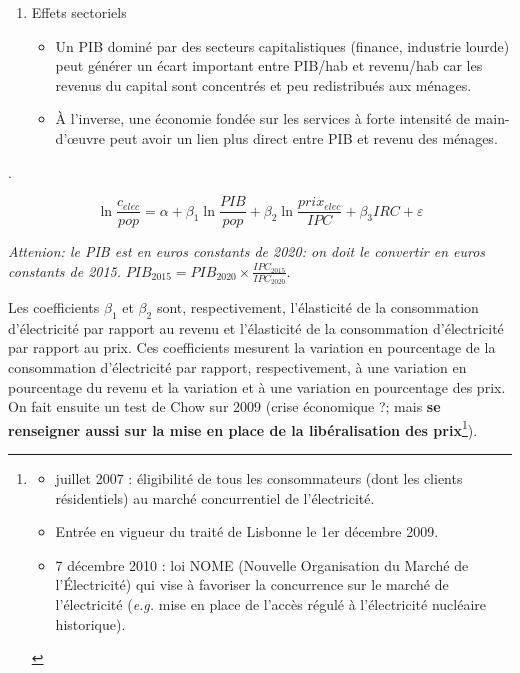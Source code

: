 {{\begin{enumerate}
\begin{itemize}
    \end{itemize}
    \item Effets sectoriels
    \begin{itemize}
        \item Un PIB dominé par des secteurs capitalistiques (finance, industrie lourde) peut générer un écart important entre PIB/hab et revenu/hab car les revenus du capital sont concentrés et peu redistribués aux ménages.
        \item À l’inverse, une économie fondée sur les services à forte intensité de main-d’œuvre peut avoir un lien plus direct entre PIB et revenu des ménages.
    \end{itemize}
\end{enumerate}}}.

\begin{equation}
    \ln{\frac{c_{elec}}{pop}} = \alpha + \beta_1 \ln{\frac{{PIB}}{pop}} + \beta_2 \ln{\frac{prix_{elec}}{IPC}} + \beta_3 IRC + \varepsilon
\end{equation}

\textit{Attenion: le PIB est en euros constants de 2020: on doit le convertir en euros constants de 2015.} 
$PIB_{2015} = PIB_{2020} \times \frac{IPC_{2015}}{IPC_{2020}}$.

Les coefficients $\beta_1$ et $\beta_2$ sont, respectivement, l’élasticité de la consommation
d’électricité par rapport au revenu et l’élasticité de la consommation d’électricité par rapport au prix. Ces coefficients mesurent la variation en pourcentage de la
consommation d’électricité par rapport, respectivement, à une variation en pourcentage du revenu et la variation et à une variation en pourcentage des prix. \\

On fait ensuite un test de Chow sur 2009 (crise économique ?; mais \textbf{se renseigner aussi sur la mise en place de la libéralisation des prix}\footnote{
    \begin{itemize}
        \item juillet 2007 : éligibilité de tous les consommateurs (dont les clients résidentiels) au marché concurrentiel de l’électricité.
        \item Entrée en vigueur du traité de Lisbonne le 1er décembre 2009.
        \item 7 décembre 2010 : loi NOME (Nouvelle Organisation du Marché de l’Électricité) qui vise à favoriser la concurrence sur le marché de l’électricité (\textit{e.g.} mise en place de l'accès régulé à l'électricité nucléaire historique).
\end{itemize}}).

